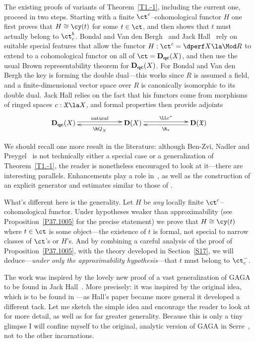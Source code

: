 \documentclass[11pt]{amsart}
\newcommand{\D}{{\mathbf D}}
\newcommand{\Dqc}{{\mathbf D_{\text{\bf qc}}}}
\begin{document}
The existing proofs of variants
of Theorem~\ref{T1.-1}, including the current one, proceed in two steps.
Starting with a finite $\ct^c$--cohomological functor $H$ one
first proves that $H\cong\cy(t)$ for some $t\in\ct$, and then shows
that $t$ must actually belong to $\ct^b_c$.
Bondal and Van den
Bergh~\cite[Theorem~A.1]{BondalvandenBergh04} and
Jack Hall~\cite[Proposition~4.1]{Hall18} rely on suitable
special features that allow the functor
$H:\ct^c=\dperf X\la\Mod R$ to extend
to a cohomological functor on all of $\ct=\Dqc(X)$, and then use
the usual Brown representability theorem for $\Dqc(X)$.
For Bondal and Van den Bergh
the key is forming the double dual---this works since $R$ is assumed
a field, and a finite-dimensional
vector space over $R$ is canonically isomorphic to its double
dual. Jack Hall relies on the fact that his
functors come from morphisms of ringed
spaces $c:\mathfrak{X}\la X$, and
formal properties then provide  adjoints
\[\xymatrix@C+40pt{
\Dqc(X)\ar@<0.5ex>[r]^-{\text{natural}} &\ar@<0.5ex>[l]^-{\R Q_X^{}} \D(X)
\ar@<0.5ex>[r]^-{\LL c^*}&\ar@<0.5ex>[l]^-{\R _*} \D(\mathfrak{X})
}\]

 We should recall one more result in the literature: although
Ben-Zvi, Nadler and Preygel~\cite[Section~3]{BenZvi-Nadler-Preygel16}
is not technically either a special case or a generalization
of  Theorem~\ref{T1.-1}, the
reader is nonetheless encouraged to look at it---there are
interesting parallels.
Enhancements
play a role in~\cite{BenZvi-Nadler-Preygel16}, as well as
the construction of an explicit generator and estimates
similar to those of
\cite[Theorem~4.1]{Lipman-Neeman07}. 


What's different here is the generality. Let
$H$ be \emph{any}
locally finite $\ct^c$--cohomological functor.
Under hypotheses
weaker
than approximability (see
Proposition~\ref{P37.1005} for the precise statement)
we prove that $H\cong\cy(t)$ where $t\in\ct$ is some object---the
existence of $t$ is formal, not special 
to narrow classes of $\ct$'s or $H$'s.
And by combining a careful analysis of the
proof of Proposition~\ref{P37.1005},
with the theory developed in Section~\ref{S17}, we will
deduce---\emph{under only
the approximability hypothesis}---that $t$ must belong to $\ct^-_c$.
\ermk

The work was inspired by the lovely new proof of a vast
generalization of GAGA to be found in Jack Hall~\cite{Hall18}.
More precisely: it was inspired by the original idea, which is
to be found in \cite[Section~2]{Hall18}---as Hall's paper became
more general it developed a different tack.
Let me sketch the simple idea and encourage the reader to
look at \cite{Hall18} for more detail, as well as for
far greater generality. Because this is only a
tiny glimpse I will confine myself to the original, analytic
version of GAGA in Serre~\cite{Serre56}, not to the other
incarnations.
\end{document}
